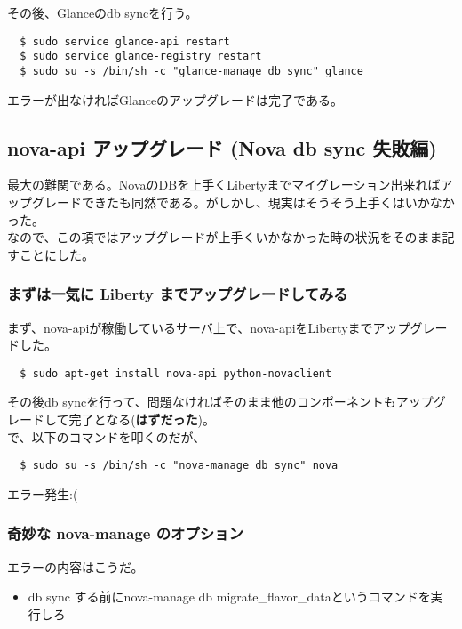 \documentclass[9pt,b5paper,tombo,openany]{jsbook}
\begin{document}
\noindent
その後、Glanceのdb syncを行う。

\begin{lstlisting}
  $ sudo service glance-api restart
  $ sudo service glance-registry restart
  $ sudo su -s /bin/sh -c "glance-manage db_sync" glance
\end{lstlisting}

\noindent
エラーが出なければGlanceのアップグレードは完了である。

\subsection{nova-api アップグレード (Nova db sync 失敗編)}
最大の難関である。NovaのDBを上手くLibertyまでマイグレーション出来ればアップグレードできたも同然である。がしかし、現実はそうそう上手くはいかなかった。\\[1ex]

\noindent
なので、この項ではアップグレードが上手くいかなかった時の状況をそのまま記すことにした。

\subsubsection{まずは一気に Liberty までアップグレードしてみる}
\noindent
まず、nova-apiが稼働しているサーバ上で、nova-apiをLibertyまでアップグレードした。

\begin{lstlisting}
  $ sudo apt-get install nova-api python-novaclient
\end{lstlisting}

その後db syncを行って、問題なければそのまま他のコンポーネントもアップグレードして完了となる(\textbf{はずだった})。\\[1ex]

\noindent
で、以下のコマンドを叩くのだが、

\begin{lstlisting}
  $ sudo su -s /bin/sh -c "nova-manage db sync" nova
\end{lstlisting}

\noindent
エラー発生:(

\subsubsection{奇妙な nova-manage のオプション}
\noindent
エラーの内容はこうだ。

\begin{itemize}
	\item db sync する前にnova-manage db migrate\_flavor\_dataというコマンドを実行しろ
\end{itemize}
\end{document}
